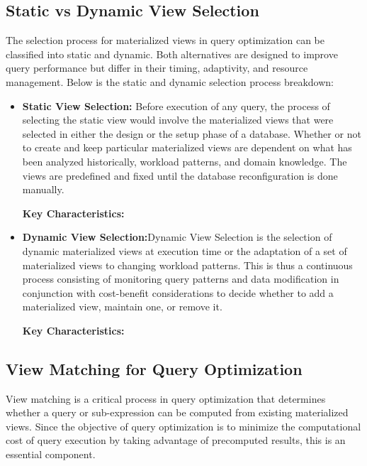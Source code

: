 \subsection{ Static vs Dynamic View Selection } The selection process for materialized views in query optimization can be classified into static and dynamic. Both alternatives are designed to improve query performance but differ in their timing, adaptivity, and resource management. Below is the static and dynamic selection process breakdown:
\begin{itemize}
    \item \textbf{Static View Selection:} Before execution of any query, the process of selecting the static view would involve the materialized views that were selected in either the design or the setup phase of a database. Whether or not to create and keep particular materialized views are dependent on what has been analyzed historically, workload patterns, and domain knowledge. The views are predefined and fixed until the database reconfiguration is done manually.\vspace{.4cm}
    
    \textbf{Key Characteristics:}
    \item \textbf{Dynamic View Selection:}Dynamic View Selection is the selection of dynamic materialized views at execution time or the adaptation of a set of materialized views to changing workload patterns. This is thus a continuous process consisting of monitoring query patterns and data modification in conjunction with cost-benefit considerations to decide whether to add a materialized view, maintain one, or remove it.\vspace{.4cm}
    
    \textbf{Key Characteristics:}
\end{itemize}


\subsection{View Matching for Query Optimization }

View matching is a critical process in query optimization that determines whether a query or sub-expression can be computed from existing materialized views. Since the objective of query optimization is to minimize the computational cost of query execution by taking advantage of precomputed results, this is an essential component.\vspace{.4cm}

